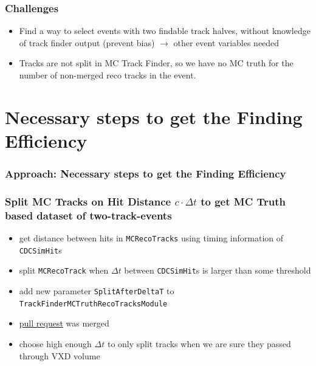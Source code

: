 \documentclass[18pt]{beamer}
\begin{document}
\begin{frame}
  \frametitle{Challenges}
    \begin{itemize}
    \item Find a way to select events with two findable track halves, without knowledge of track finder output (prevent bias) $\rightarrow$ other event variables needed
    \item Tracks are not split in MC Track Finder, so we have no MC truth for the number of non-merged reco tracks in the event.
    \end{itemize}
\end{frame}

\section{Necessary steps to get the Finding Efficiency}
\begin{frame}
  \frametitle{Approach: Necessary steps to get the Finding Efficiency}
  
\end{frame}


\begin{frame}
  \frametitle{Split MC Tracks on Hit Distance $c \cdot \Delta t$ to get MC Truth based dataset of two-track-events}
  \begin{itemize}
  \item get distance between hits in \texttt{MCRecoTracks} using timing information of \texttt{CDCSimHit}s
  \item split \texttt{MCRecoTrack} when  $\Delta t$ between \texttt{CDCSimHit}s is larger than some threshold
  \item add new parameter \texttt{SplitAfterDeltaT} to \texttt{TrackFinderMCTruthRecoTracksModule}
  \item \href{https://stash.desy.de/projects/B2/repos/software/pull-requests/737}{pull request} was merged
  \item choose high enough $\Delta t$ to only split tracks when we are sure they passed through VXD volume\\
  \end{itemize}
\end{frame}
\end{document}

